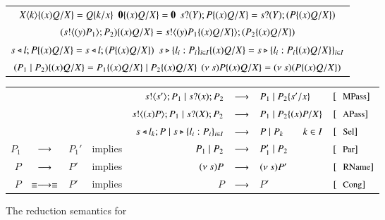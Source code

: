 \begin{figure}
	\begin{tabular}{c}
		$X\langle k \rangle \{(x)Q/X \} = Q \{k/x \}$
		\qquad
		$\mathbf{0} \{(x)Q/X \} = \mathbf{0}$
		\qquad
		$s ? (Y) ; P \{(x)Q/X \} = s ? (Y) ; (P \{(x)Q/X \})$
		\\
		$(s ! \langle (y)P_1 \rangle ; P_2) \{(x)Q/X \} = s ! \langle (y)P_1 \{(x)Q/X \} \rangle ; (P_2 \{(x)Q/X \})$
		\\
		$s \triangleleft l ; P \{(x)Q/X \} = s \triangleleft l ; (P \{(x)Q/X \})$
		\qquad
		$s \triangleright \{l_i : P_i\}_{i \in I} \{(x)Q/X \} = s \triangleright \{l_i : P_i \{(x)Q/X \}\}_{i \in I}$
		\\
		$(P_1 \;|\; P_2) \{(x)Q/X \} = P_1 \{(x)Q/X \} \;|\; P_2 \{(x)Q/X \}$
		\qquad
		$(\nu\ s) P \{(x)Q/X \} = (\nu\ s) (P \{(x)Q/X \})$
	\end{tabular}

	\begin{tabular}{rclcrcll}
		&& && $s ! \langle s' \rangle ; P_1 \;|\; s ? (x) ; P_2$ &$\longrightarrow$& $P_1 \;|\; P_2 \{s'/x \}$ & $\orule{MPass}$ \\
		&& && $s ! \langle (x)P \rangle ; P_1 \;|\; s ? (X) ; P_2$ &$\longrightarrow$& $P_1 \;|\; P_2 \{(x)P/X \}$ & $\orule{APass}$ \\
		&& && $s \triangleleft l_k ; P \;|\; s \triangleright \{l_i : P_i\}_{i \in I}$ &$\longrightarrow$& $P \;|\; P_k \qquad k \in I$ & $\orule{Sel}$\\
		$P_1$ &$\longrightarrow$& $P_1'$ &implies& $P_1 \;|\; P_2$ &$\longrightarrow$& $P_1' \;|\; P_2$ & $\orule{Par}$ \\
		$P$ &$\longrightarrow$& $P'$ &implies& $(\nu\ s) P$ &$\longrightarrow$& $(\nu\ s) P'$ & $\orule{RName}$\\
		$P$ &$\equiv \longrightarrow \equiv$& $P'$ &implies& $P$ &$\longrightarrow$& $P'$ & $\orule{Cong}$
	\end{tabular}
	\caption{The reduction semantics for \fHOp \label{fig:reduction}}
\end{figure}
